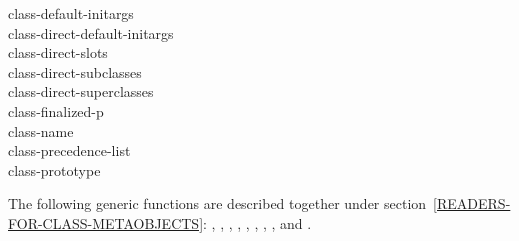 \begin{defun}
class-default-initargs \\
class-direct-default-initargs \\
class-direct-slots \\
class-direct-subclasses \\
class-direct-superclasses \\
class-finalized-p \\
class-name \\
class-precedence-list \\
class-prototype

The following generic functions are described together under
section~\ref{READERS-FOR-CLASS-METAOBJECTS}: ,
, ,
, ,
, , ,
 and .
\end{defun}

